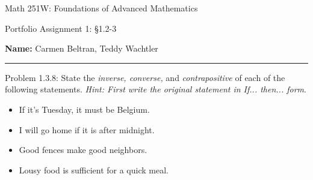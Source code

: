 \documentclass{article}
\theoremstyle{definition}
\begin{document}
	\begin{center}
		\Large{Math 251W: Foundations of Advanced Mathematics}

		\normalsize{Portfolio Assignment 1: \S 1.2-3}

		\vspace{0.2cm}

		\hfill {\bf Name:} Carmen Beltran, Teddy Wachtler

		\vspace{0.25cm}
		\hrule
	\end{center}

	\vspace{0.3cm}


	\noindent Problem 1.3.8: State the {\it inverse, converse,} and {\it contrapositive} of each of the following statements. \emph{Hint: First write the original statement in If... then... form}.
	\begin{itemize}
		\item[(1)] If it's Tuesday, it must be Belgium.
		\item[(2)] I will go home if it is after midnight.
		\item[(3)] Good fences make good neighbors.
		\item[(4)] Lousy food is sufficient for a quick meal.
	\end{itemize}
\end{document}
